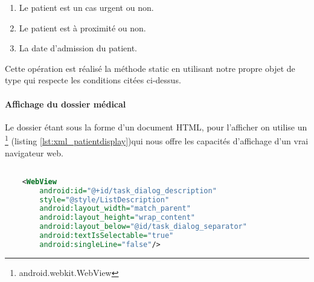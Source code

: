 \begin{enumerate}

\item Le patient est un cas urgent ou non.

\item Le patient est à proximité ou non.

\item La date d'admission du patient.

\end{enumerate}

Cette opération est réalisé la méthode static  en utilisant notre propre objet de type  qui respecte les conditions citées ci-dessus.


\paragraph{Affichage du dossier médical}

Le dossier étant sous la forme d'un document HTML, pour l'afficher on utilise un \footnote{android.webkit.WebView} (listing \ref{lst:xml_patientdisplay})qui nous offre les capacités d'affichage d'un vrai navigateur web.


\begin{lstlisting}[language=xml, label=lst:xml_patientdisplay, caption=Déclaration XML du WebView utilisé par PatientDisplay]

    <WebView
        android:id="@+id/task_dialog_description"
        style="@style/ListDescription"
        android:layout_width="match_parent"
        android:layout_height="wrap_content"
        android:layout_below="@id/task_dialog_separator"
        android:textIsSelectable="true" 
        android:singleLine="false"/>

\end{lstlisting}